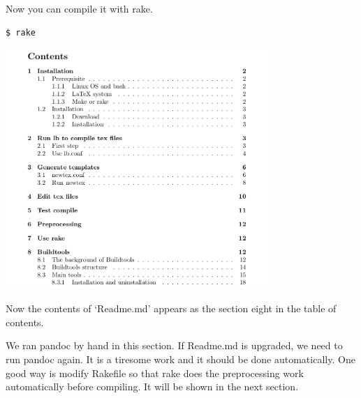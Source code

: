 Now you can compile it with rake.
\begin{verbatim}
$ rake
\end{verbatim}

\begin{center}
\includegraphics[width=10cm]{tableofcontents.png}
\end{center}

Now the contents of `Readme.md' appears as the section eight in the table of contents.

We ran pandoc by hand in this section.
If Readme.md is upgraded, we need to run pandoc again.
It is a tiresome work and it should be done automatically.
One good way is modify Rakefile so that rake does the preprocessing work automatically before compiling.
It will be shown in the next section.

